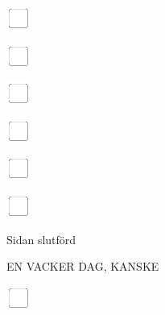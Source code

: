 \documentclass[11pt,titlepage]{article}
\begin{document}
\vspace{10mm}

\noindent
\includegraphics[]{checkbox-4mm.pdf}

\vspace{10mm}

\noindent
\includegraphics[]{checkbox-4mm.pdf}

\vspace{10mm}

\noindent
\includegraphics[]{checkbox-4mm.pdf}

\vspace{10mm}

\noindent
\includegraphics[]{checkbox-4mm.pdf}

\vspace{10mm}

\noindent
\includegraphics[]{checkbox-4mm.pdf}

\vspace{10mm}

\noindent
\includegraphics[]{checkbox-4mm.pdf}

\vspace{4mm}

\hfill Sidan slutförd \hspace{20mm}

\pagebreak

\small %
\hfill EN VACKER DAG, KANSKE

\vspace{6mm}

\noindent
\includegraphics[]{checkbox-4mm.pdf}
\end{document}
